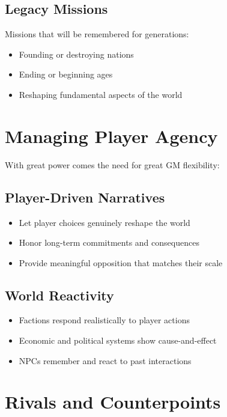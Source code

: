 \subsection*{Legacy Missions}

Missions that will be remembered for generations:
\begin{itemize}
    \item Founding or destroying nations
    \item Ending or beginning ages
    \item Reshaping fundamental aspects of the world
\end{itemize}

\section{Managing Player Agency}

With great power comes the need for great GM flexibility:

\subsection*{Player-Driven Narratives}

\begin{itemize}
    \item Let player choices genuinely reshape the world
    \item Honor long-term commitments and consequences
    \item Provide meaningful opposition that matches their scale
\end{itemize}

\subsection*{World Reactivity}

\begin{itemize}
    \item Factions respond realistically to player actions
    \item Economic and political systems show cause-and-effect
    \item NPCs remember and react to past interactions
\end{itemize}

\section{Rivals and Counterpoints}


